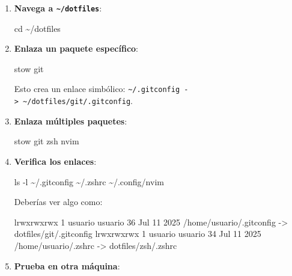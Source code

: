 \documentclass[
  jou,
  floatsintext,
  longtable,
  a4paper,
  nolmodern,
  notxfonts,
  notimes,
  colorlinks=true,linkcolor=blue,citecolor=blue,urlcolor=blue]{apa7}
\newenvironment{Shaded}{\begin{snugshade}}{\end{snugshade}}
\newcommand{\AttributeTok}[1]{\textcolor[rgb]{0.40,0.45,0.13}{#1}}
\newcommand{\BuiltInTok}[1]{\textcolor[rgb]{0.00,0.23,0.31}{#1}}
\newcommand{\ExtensionTok}[1]{\textcolor[rgb]{0.00,0.23,0.31}{#1}}
\newcommand{\FunctionTok}[1]{\textcolor[rgb]{0.28,0.35,0.67}{#1}}
\newcommand{\NormalTok}[1]{\textcolor[rgb]{0.00,0.23,0.31}{#1}}
\begin{document}
\begin{enumerate}
\def\labelenumi{\arabic{enumi}.}
\item
  \textbf{Navega a \texttt{\textasciitilde{}/dotfiles}}:

\begin{Shaded}
\begin{Highlighting}[]
\BuiltInTok{cd}\NormalTok{ \textasciitilde{}/dotfiles}
\end{Highlighting}
\end{Shaded}
\item
  \textbf{Enlaza un paquete específico}:

\begin{Shaded}
\begin{Highlighting}[]
\ExtensionTok{stow}\NormalTok{ git}
\end{Highlighting}
\end{Shaded}

  Esto crea un enlace simbólico:
  \texttt{\textasciitilde{}/.gitconfig\ -\textgreater{}\ \textasciitilde{}/dotfiles/git/.gitconfig}.
\item
  \textbf{Enlaza múltiples paquetes}:

\begin{Shaded}
\begin{Highlighting}[]
\ExtensionTok{stow}\NormalTok{ git zsh nvim}
\end{Highlighting}
\end{Shaded}
\item
  \textbf{Verifica los enlaces}:

\begin{Shaded}
\begin{Highlighting}[]
\FunctionTok{ls} \AttributeTok{{-}l}\NormalTok{ \textasciitilde{}/.gitconfig \textasciitilde{}/.zshrc \textasciitilde{}/.config/nvim}
\end{Highlighting}
\end{Shaded}

  Deberías ver algo como:

\begin{Shaded}
\begin{Highlighting}[]
\NormalTok{lrwxrwxrwx 1 usuario usuario 36 Jul 11 2025 /home/usuario/.gitconfig {-}\textgreater{} dotfiles/git/.gitconfig}
\NormalTok{lrwxrwxrwx 1 usuario usuario 34 Jul 11 2025 /home/usuario/.zshrc {-}\textgreater{} dotfiles/zsh/.zshrc}
\end{Highlighting}
\end{Shaded}
\item
  \textbf{Prueba en otra máquina}:


\end{enumerate}
\end{document}
